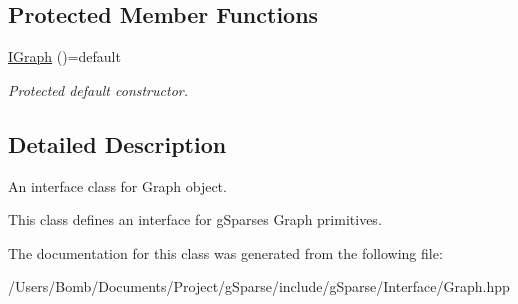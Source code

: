 \subsection*{Protected Member Functions}
\begin{DoxyCompactItemize}
\item 
\mbox{\label{classg_sparse_1_1_i_graph_a49f79b460e4166da28dd0f188bd0e34e}} 
\mbox{\hyperlink{classg_sparse_1_1_i_graph_a49f79b460e4166da28dd0f188bd0e34e}{I\+Graph}} ()=default
\begin{DoxyCompactList}\small\item\em Protected default constructor. \end{DoxyCompactList}\end{DoxyCompactItemize}


\subsection{Detailed Description}
An interface class for Graph object. 

This class defines an interface for g\+Sparse\textquotesingle{}s Graph primitives. 

The documentation for this class was generated from the following file\+:\begin{DoxyCompactItemize}
\item 
/\+Users/\+Bomb/\+Documents/\+Project/g\+Sparse/include/g\+Sparse/\+Interface/Graph.\+hpp\end{DoxyCompactItemize}
